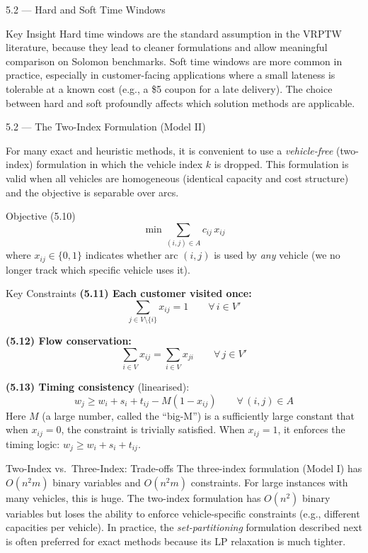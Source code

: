 \documentclass[aspectratio=169,10pt]{beamer}
\begin{document}
\begin{frame}[allowframebreaks]{5.2 --- Hard and Soft Time Windows}
\begin{alertblock}{Key Insight}
Hard time windows are the standard assumption in the VRPTW literature, because they
lead to cleaner formulations and allow meaningful comparison on Solomon benchmarks.
Soft time windows are more common in practice, especially in customer-facing
applications where a small lateness is tolerable at a known cost (e.g., a \$5
coupon for a late delivery).  The choice between hard and soft profoundly affects
which solution methods are applicable.
\end{alertblock}

\end{frame}

\begin{frame}[allowframebreaks]{5.2 --- The Two-Index Formulation (Model II)}

For many exact and heuristic methods, it is convenient to use a
\emph{vehicle-free} (two-index) formulation in which the vehicle index $k$ is
dropped.  This formulation is valid when all vehicles are homogeneous (identical
capacity and cost structure) and the objective is separable over arcs.

\begin{block}{Objective (5.10)}
\[
  \min \sum_{(i,j) \in A} c_{ij} \, x_{ij}
\]
where $x_{ij} \in \{0,1\}$ indicates whether arc $(i,j)$ is used by \emph{any}
vehicle (we no longer track which specific vehicle uses it).
\end{block}

\begin{block}{Key Constraints}
\textbf{(5.11) Each customer visited once:}
\[
  \sum_{j \in V \setminus \{i\}} x_{ij} = 1 \qquad \forall\, i \in V'
\]

\textbf{(5.12) Flow conservation:}
\[
  \sum_{i \in V} x_{ij} = \sum_{i \in V} x_{ji} \qquad \forall\, j \in V'
\]

\textbf{(5.13) Timing consistency} (linearised):
\[
  w_j \geq w_i + s_i + t_{ij} - M(1 - x_{ij}) \qquad \forall\, (i,j) \in A
\]
Here $M$ (a large number, called the ``big-M'') is a sufficiently large constant
that when $x_{ij}=0$, the constraint is trivially satisfied.  When $x_{ij}=1$, it
enforces the timing logic: $w_j \geq w_i + s_i + t_{ij}$.
\end{block}

\framebreak

\begin{alertblock}{Two-Index vs.\ Three-Index: Trade-offs}
The three-index formulation (Model I) has $O(n^2 m)$ binary variables and $O(n^2 m)$
constraints.  For large instances with many vehicles, this is huge.  The two-index
formulation has $O(n^2)$ binary variables but loses the ability to enforce
vehicle-specific constraints (e.g., different capacities per vehicle).  In practice,
the \emph{set-partitioning} formulation described next is often preferred for exact
methods because its LP relaxation is much tighter.
\end{alertblock}


\end{frame}
\end{document}
